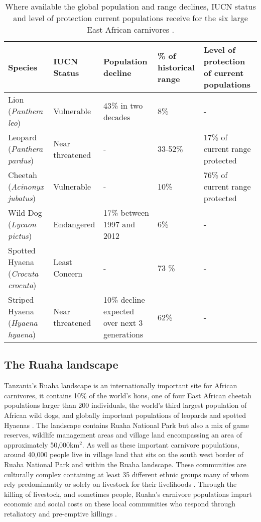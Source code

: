\begin{table}[h]
	\small
	\begin{center}
		\begin{tabular}{p{2.1cm} p{2.7cm} p{3cm} p{3cm} p{3cm}}
			\hline \hline		
			Species 			& IUCN Status			& Population decline 	& \% of historical range & Level of protection of current populations\\ \hline
			Lion	 (\textit{Panthera leo})				& Vulnerable 		& 43\% in two decades 		& 8\% 		& - \\
			Leopard 	(\textit{Panthera pardus})		& Near threatened 	& -	 						& 33-52\% 	&17\% of current range protected\\
			Cheetah (\textit{Acinonyx jubatus})		& Vulnerable			& - 							& 10\% 		& 76\% of current range protected\\
			Wild Dog (\textit{Lycaon pictus})		& Endangered			& 17\% between 1997 and 2012	& 6\%		& - \\
			Spotted Hyaena (\textit{Crocuta crocuta})& Least Concern		& - 							& 73	\%		& - \\
			Striped Hyaena (\textit{Hyaena hyaena})	& Near threatened	& 10\% decline expected over next 3 generations & 62\% & - \\
			\hline \hline						
		\end{tabular}
		\caption{Where available the global population and range declines, IUCN status and level of protection current populations receive for the six large East African carnivores \cite{Loe2004a,Woodroffe2012a,iucn2007regional,Bauer2016,jacobson2016leopard,AbiSaid2015,Bohm2015,IUCN2016,Ray2005,Durant2015}.}
	\label{table:EACarn}
	\end{center}
\end{table}

\subsection{The Ruaha landscape}
 
Tanzania's Ruaha landscape is an internationally important site for African carnivores, it contains 10\% of the world's lions, one of four East African cheetah populations larger than 200 individuals, the world's third largest population of African wild dogs, and globally important populations of leopards and spotted Hyaenas \cite{Dickman2014d}. The landscape contains Ruaha National Park but also a mix of game reserves, wildlife management areas and village land encompassing an area of approximately 50,000km$^2$. As well as these important carnivore populations, around 40,000 people live in village land that sits on the south west border of Ruaha National Park and within the Ruaha landscape. These communities are culturally complex containing at least 35 different ethnic groups many of whom rely predominantly or solely on livestock for their livelihoods  \cite{Abade2014h}. Through the killing of livestock, and sometimes people, Ruaha's carnivore populations impart economic and social costs on these local communities who respond through retaliatory and pre-emptive killings \cite{Dickman2010b}.\\

